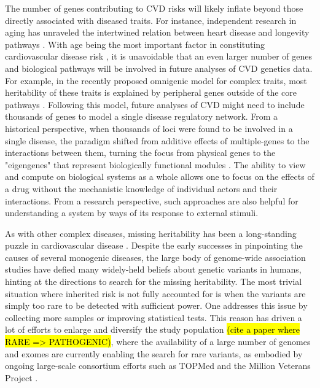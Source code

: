 \documentclass[letter]{bioinfo}
\begin{document}
	The number of genes contributing to CVD risks will likely inflate beyond those directly associated with diseased traits.  For instance, independent research in aging has unraveled the intertwined relation between heart disease and longevity pathways \citep{North:2012:Intersection}.  With age being the most important factor in constituting cardiovascular disease risk \citep{Steenman:2017:Cardiac}, it is unavoidable that an even larger number of genes and biological pathways will be involved in future analyses of CVD genetics data.  For example, in the recently proposed omnigenic model for complex traits, most heritability of these traits is explained by peripheral genes outside of the core pathways \citep{Boyle:2017:Expanded}. Following this model, future analyses of CVD might need to include thousands of genes to model a single disease regulatory network. From a historical perspective, when thousands of loci were found to be involved in a single disease, the paradigm shifted from additive effects of multiple-genes to the interactions between them, turning the focus from physical genes to the "eigengenes" that represent biologically functional modules \citep{Weiss:2012:Good}. The ability to view and compute on biological systems as a whole allows one to focus on the effects of a drug without the mechanistic knowledge of individual actors and their interactions. From a research perspective, such approaches are also helpful for understanding a system by ways of its response to external stimuli. 
	
	As with other complex diseases, missing heritability has been a long-standing puzzle in cardiovascular disease \citep{Manolio:2009:Finding}. Despite the early successes in pinpointing the causes of several monogenic diseases, the large body of genome-wide association studies have defied many widely-held beliefs about genetic variants in humans, hinting at the directions to search for the missing heritability.  The most trivial situation where inherited risk is not fully accounted for is when the variants are simply too rare to be detected with sufficient power. One addresses this issue by collecting more samples or improving statistical tests.  This reason has driven a lot of efforts to enlarge and diversify the study population \hl{(cite a paper where RARE => PATHOGENIC)}, where the availability of a large number of genomes and exomes are currently enabling the search for rare variants, as embodied by ongoing large-scale consortium efforts such as TOPMed \citep{NHLBI:2014:TransOmics} and the Million Veterans Project \citep{Gaziano:2016:Million}.    
	
\end{document}
